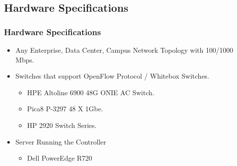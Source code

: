 \documentclass[10pt]{beamer}
\begin{document}
\begin{frame}
\section[]{Hardware Specifications}
\frametitle{Hardware Specifications}
\begin{itemize}
\footnotesize
\item
Any Enterprise, Data Center, Campus Network Topology with 100/1000 Mbps.
\item
Switches that support OpenFlow Protocol / Whitebox Switches.
\begin{itemize}
\footnotesize
\item
HPE Altoline 6900 48G ONIE AC Switch.
\item
Pica8 P-3297 48 X 1Gbe.
\item
HP 2920 Switch Series.
\end{itemize}

\item
Server Running the Controller
\begin{itemize}
\footnotesize
\item
Dell PowerEdge R720
\end{itemize}

\end{itemize}
\end{frame}
\end{document}
